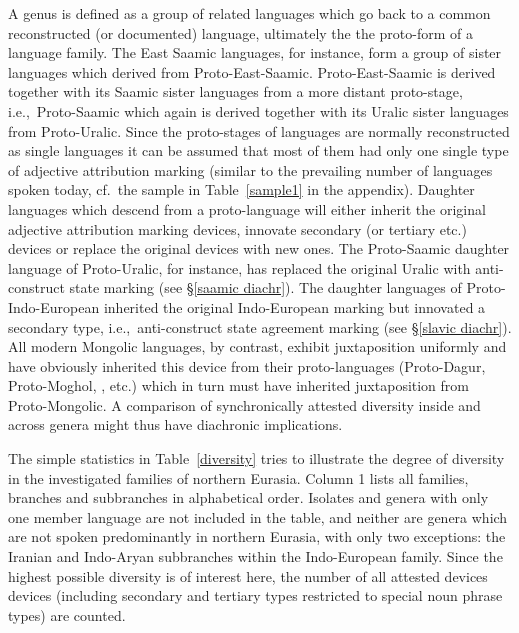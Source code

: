 A genus is defined as a group of related languages which go back to a common reconstructed (or documented) language, ultimately the the proto-form of a language family. The East Saamic languages, for instance, form a group of sister languages which derived from Proto\hyp{}East-Saamic. Proto\hyp{}East-Saamic is derived together with its Saamic sister languages from a more distant proto-stage, i.e.,~Proto\hyp{}Saamic which again is derived together with its Uralic sister languages from Proto\hyp{}Uralic. Since the proto-stages of languages are normally reconstructed as single languages it can be assumed that most of them had only one single type of adjective attribution marking (similar to the prevailing number of languages spoken today, cf.~the sample in Table~\ref{sample1} in the appendix). Daughter languages which descend from a proto-language will either inherit the original adjective attribution marking devices, innovate secondary (or tertiary etc.) devices or replace the original devices with new ones. The Proto\hyp{}Saamic daughter language of Proto\hyp{}Uralic, for instance, has replaced the original Uralic  with anti\hyp{}construct state marking (see \S\ref{saamic diachr}). The  daughter languages of Proto\hyp{}Indo-European inherited the original Indo-European  marking but innovated a secondary type, i.e.,~anti\hyp{}construct state agreement marking (see \S\ref{slavic diachr}). All modern Mongolic languages, by contrast, exhibit juxtaposition uniformly and have obviously inherited this device from their proto-languages (Proto\hyp{}Dagur, Proto\hyp{}Moghol, , etc.) which in turn must have inherited juxtaposition from Proto\hyp{}Mongolic. A comparison of synchronically attested diversity inside and across genera might thus have diachronic implications.

The simple statistics in Table~\ref{diversity} tries to illustrate the degree of diversity in the investigated families of northern Eurasia. Column 1 lists all families, branches and subbranches in alphabetical order. Isolates and genera with only one member language are not included in the table, and neither are genera which are not spoken predominantly in northern Eurasia, with only two exceptions: the Iranian and Indo-Aryan subbranches within the Indo-European family. Since the highest possible diversity is of interest here, the number of all attested devices devices (including secondary and tertiary types restricted to special noun phrase types) are counted. 

